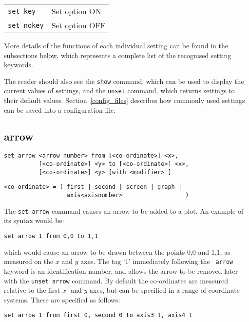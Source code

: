 \documentclass[a4paper,onecolumn,11pt]{book}
\begin{document}
\begin{tabular}{ll}
{\tt set key} & Set option ON \\
{\tt set nokey} & Set option OFF
\end{tabular}

More details of the functions of each individual setting can be found in the
subsections below, which represents a complete list of the recognised setting
keywords.

The reader should also see the {\tt show} command, which can be used to display
the current values of settings, and the {\tt unset} command, which returns
settings to their default values. Section~\ref{config_files} describes how
commonly used settings can be saved into a configuration file.

\subsection{arrow}

\begin{verbatim}
set arrow <arrow number> from [<co-ordinate>] <x>,
          [<co-ordinate>] <y> to [<co-ordinate>] <x>,
          [<co-ordinate>] <y> [with <modifier> ]
\end{verbatim}

\begin{verbatim}
<co-ordinate> = ( first | second | screen | graph |
                  axis<axisnumber>                  )
\end{verbatim}

The {\tt set arrow} command causes an arrow to be added to a plot. An example of
its syntax would be:

\begin{verbatim}
set arrow 1 from 0,0 to 1,1
\end{verbatim}

\noindent which would cause an arrow to be drawn between the points 0,0 and 1,1, as
measured on the $x$ and $y$ axes.  The tag `1' immediately following the {\tt
arrow} keyword is an identification number, and allows the arrow to be removed
later with the {\tt unset arrow} command.  By default the co-ordinates are
measured relative to the first $x$- and $y$-axes, but can be specified in a range
of coordinate systems. These are specified as follows:

\begin{verbatim}
set arrow 1 from first 0, second 0 to axis3 1, axis4 1
\end{verbatim}
\end{document}
